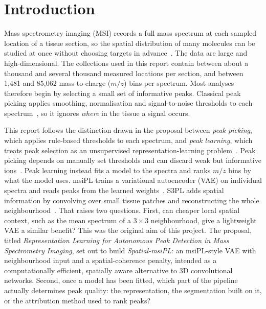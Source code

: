 \section{Introduction}
\label{sec:introduction}

Mass spectrometry imaging (MSI) records a full mass spectrum at each sampled
location of a tissue section, so the spatial distribution of many molecules can
be studied at once without choosing targets in
advance~\citep{caprioli1997maldi,schwamborn2010molecular,buchberger2018mass}.
The data are large and high-dimensional. The collections used in this report
contain between about a thousand and several thousand measured locations per
section, and between 1{,}481 and 85{,}062 mass-to-charge ($m/z$) bins per
spectrum. Most analyses therefore begin by selecting a small set of informative
peaks. Classical peak picking applies smoothing, normalisation and
signal-to-noise thresholds to each spectrum~\citep{gibb2012maldiquant,deininger2011normalization},
so it ignores \emph{where} in the tissue a signal occurs.

This report follows the distinction drawn in the proposal between
\emph{peak picking}, which applies rule-based thresholds to each spectrum, and
\emph{peak learning}, which treats peak selection as an unsupervised
representation-learning problem~\citep{li2022machinelearningpeakpicking,abdelmoula2021peak}.
Peak picking depends on manually set thresholds and can discard weak but
informative ions~\citep{lieb2020sparse}. Peak learning instead fits a model to
the spectra and ranks $m/z$ bins by what the model uses. msiPL trains a variational autoencoder (VAE)
on individual spectra and reads peaks from the learned
weights~\citep{abdelmoula2021peak}. S3PL adds spatial information by convolving
over small tissue patches and reconstructing the whole
neighbourhood~\citep{weigand2026spatial}. That raises two questions. First, can
cheaper local spatial context, such as the mean spectrum of a $3\times3$
neighbourhood, give a lightweight VAE a similar benefit? This was the original
aim of this project. The proposal, titled \emph{Representation Learning for
Autonomous Peak Detection in Mass Spectrometry Imaging}, set out to build
\emph{Spatial-msiPL}: an msiPL-style VAE with neighbourhood input and a
spatial-coherence penalty, intended as a computationally efficient,
spatially aware alternative to 3D convolutional networks. Second, once a model has been fitted, which part of the
pipeline actually determines peak quality: the representation, the
segmentation built on it, or the attribution method used to rank peaks?

